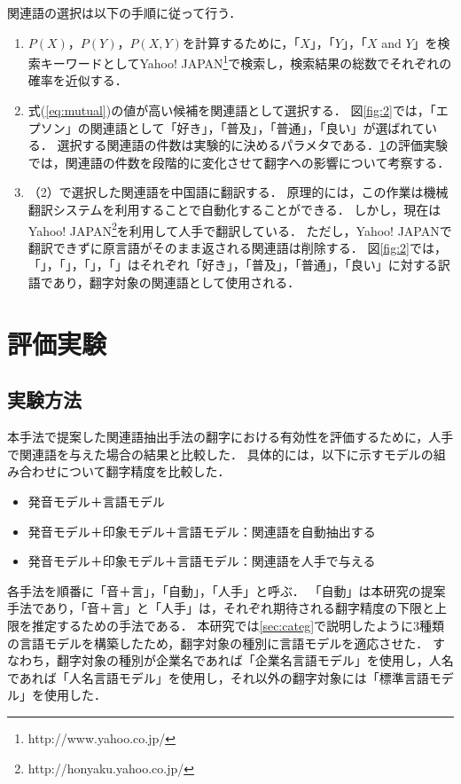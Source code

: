 \documentclass[japanese]{jnlp_1.4}
\begin{document}
{関連語の選択は以下の手順に従って行う．
\begin{enumerate}
\item $P(X)$，$P(Y)$，$P(X,Y)$を計算するために，「$X$」，「$Y$」，「$X$ and $Y$」を検索キーワードとしてYahoo! JAPAN\footnote{http://www.yahoo.co.jp/}で検索し，検索結果の総数でそれぞれの確率を近似する．
\item 式(\ref{eq:mutual})の値が高い候補を関連語として選択する．
図\ref{fig:2}では，「エプソン」の関連語として「好き」，「普及」，「普通」，「良い」が選ばれている．
選択する関連語の件数は実験的に決めるパラメタである．\ref{sec:exp}の評価実験では，関連語の件数を段階的に変化させて翻字への影響について考察する．
\item （2）で選択した関連語を中国語に翻訳する．
原理的には，この作業は機械翻訳システムを利用することで自動化することができる．
しかし，現在はYahoo! JAPAN\footnote{http://honyaku.yahoo.co.jp/}を利用して人手で翻訳している．
ただし，Yahoo! JAPANで翻訳できずに原言語がそのまま返される関連語は削除する．
\mbox{図\ref{fig:2}}では，「」，「」，「」，「」はそれぞれ「好き」，「普及」，「普通」，「良い」に対する訳語であり，翻字対象の関連語として使用される．
\end{enumerate}



\section{評価実験}\label{sec:exp}

\subsection{実験方法}\label{sec:emethod}

本手法で提案した関連語抽出手法の翻字における有効性を評価するために，人手で関連語を与えた場合の結果と比較した．
具体的には，以下に示すモデルの組み合わせについて翻字精度を比較した．
\begin{itemize}
\item 発音モデル＋言語モデル
\item 発音モデル＋印象モデル＋言語モデル：関連語を自動抽出する
\item 発音モデル＋印象モデル＋言語モデル：関連語を人手で与える
\end{itemize}

各手法を順番に「音＋言」，「自動」，「人手」と呼ぶ．
「自動」は本研究の提案手法であり，「音＋言」と「人手」は，それぞれ期待される翻字精度の下限と上限を推定するための手法である．
本研究では\ref{sec:categ}で説明したように3種類の言語モデルを構築したため，翻字対象の種別に言語モデルを適応させた．
すなわち，翻字対象の種別が企業名であれば「企業名言語モデル」を使用し，人名であれば「人名言語モデル」を使用し，それ以外の翻字対象には「標準言語モデル」を使用した．

}
\end{document}
